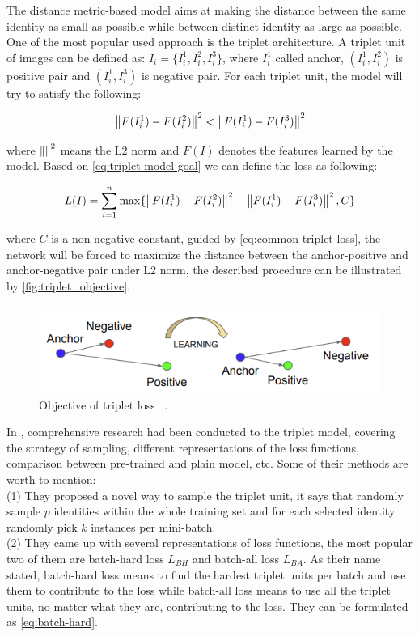 The distance metric-based model aims at making the distance between the same 
identity as small as possible while between distinct identity as large as 
possible. One of the most popular used approach is the triplet architecture.
A triplet unit of images can be defined as:
$I_i=\{I_i^1, I_i^2, I_i^3\}$,
where $I_i^1$ called anchor, $(I_i^1, I_i^2)$ is positive pair and $(I_i^1, I_i^3)$ is negative pair.
For each triplet unit, the model will try to satisfy the following:

\begin{equation}
    \label{eq:triplet-model-goal}
    \left\lVert F(I_i^1) - F(I_i^2)\right\rVert ^2 < \left\lVert F(I_i^1) - F(I_i^3)\right\rVert ^2
\end{equation}

\noindent where $\left\lVert\right\rVert^2$ means the L2 norm and $F(I)$ denotes the features 
learned by the model. Based on \autoref{eq:triplet-model-goal}
we can define the loss as following:

\begin{equation}
    \label{eq:common-triplet-loss}
    L(I) = \sum_{i=1}^{n} \max\{ \left\lVert F(I_i^1) - F(I_i^2)\right\rVert ^2 - \left\lVert F(I_i^1) - F(I_i^3)\right\rVert ^2, C \}
\end{equation}

\noindent where $C$ is a non-negative constant, guided by 
\autoref{eq:common-triplet-loss}, the network will be forced to maximize the 
distance between the anchor-positive and anchor-negative pair under L2 norm, 
the described procedure can be illustrated by \autoref{fig:triplet_objective}.

\begin{figure}
    \includegraphics[width=\linewidth]{figures/triplet_objective.png}
    \caption{Objective of triplet loss ~\protect \cite{facenet-triplet-model}.}
    \label{fig:triplet_objective}
\end{figure}

In \cite{in-defense-of-triplet-loss-for-reid-2017}, comprehensive research had 
been conducted to the triplet model, covering the
strategy of sampling, different representations of the loss functions, 
comparison between pre-trained and plain model, etc. Some of their
methods are worth to mention:\\
(1) They proposed a novel way to sample the triplet unit, it says that randomly 
sample $p$ identities within the whole training set and for
each selected identity randomly pick $k$ instances per mini-batch.\\
(2) They came up with several representations of loss functions, the most 
popular two of them are batch-hard loss $L_{BH}$ and batch-all loss $L_{BA}$.
As their name stated, batch-hard loss means to find the hardest triplet units
per batch and use them to contribute to the loss while batch-all loss 
means to use all the triplet units, no matter what they are, contributing 
to the loss. They can be formulated as \autoref{eq:batch-hard}.

